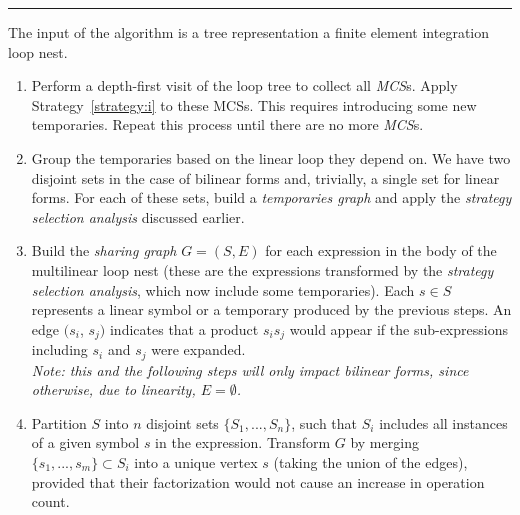 \noindent\rule[0.01ex]{\linewidth}{0.7pt}

\setcounter{Algo}{4}
\begin{Algo}
\label{algo:sharing-elimination}
\normalfont 
The input of the algorithm is a tree representation a finite element integration loop nest.
\begin{enumerate}
\item Perform a depth-first visit of the loop tree to collect all {\em MCS}s. Apply Strategy~\ref{strategy:i} to these MCSs. This requires introducing some new temporaries. Repeat this process until there are no more {\em MCS}s.

\item Group the temporaries based on the linear loop they depend on. We have two disjoint sets in the case of bilinear forms and, trivially, a single set for linear forms. For each of these sets, build a {\em temporaries graph} and apply the {\em strategy selection analysis} discussed earlier.

\item Build the {\em sharing graph} $G = (S, E)$ for each expression in the body of the multilinear loop nest (these are the expressions transformed by the {\em strategy selection analysis}, which now include some temporaries). Each $s \in S$ represents a linear symbol or a temporary produced by the previous steps. An edge $(s_i$, $s_j)$ indicates that a product $s_i s_j$ would appear if the sub-expressions including $s_i$ and $s_j$ were expanded.\\
\textit{Note: this and the following steps will only impact bilinear forms, since otherwise, due to linearity, $E = \emptyset$.}

\item Partition $S$ into $n$ disjoint sets $\lbrace S_1, ..., S_n\rbrace$, such that $S_i$ includes all instances of a given symbol $s$ in the expression. Transform $G$ by merging $\lbrace s_1, ..., s_m \rbrace \subset S_i$ into a unique vertex $s$ (taking the union of the edges), provided that their factorization would not cause an increase in operation count.


\end{enumerate}
\end{Algo}
